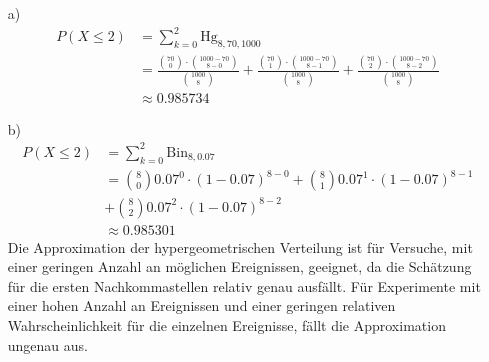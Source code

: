 \begin{enumerate}
	\item[a)] 
		\begin{equation*}
			\begin{split}
				P(X \leq 2) &= \sum_{k=0}^{2} \text{Hg}_{8,70,1000}\\
				& = \frac{{70 \choose 0} \cdot {1000 - 70 \choose 8 - 0}}{{1000\choose 8}} 
				+ \frac{{70 \choose 1} \cdot {1000 - 70 \choose 8 - 1}}{{1000\choose 8}}
				+ \frac{{70 \choose 2} \cdot {1000 - 70 \choose 8 - 2}}{{1000\choose 8}} \\
				& \approx 0.985734
			\end{split}
		\end{equation*}
	\item[b)]
		\begin{equation*}
			\begin{split}
				P(X \leq 2) & = \sum_{k = 0}^{2} \text{Bin}_{8, 0.07}\\
				& = {8 \choose 0} 0.07^{0}\cdot (1-0.07)^{8-0} 
				+ {8 \choose 1} 0.07^{1}\cdot (1-0.07)^{8-1} \\ 
				&+ {8 \choose 2} 0.07^{2}\cdot (1-0.07)^{8-2} \\
				& \approx 0.985301
			\end{split}
		\end{equation*}
		Die Approximation der hypergeometrischen Verteilung ist für Versuche, mit einer geringen Anzahl an möglichen Ereignissen, geeignet, da die Schätzung für die ersten Nachkommastellen relativ genau ausfällt. Für Experimente mit einer hohen Anzahl an Ereignissen und einer geringen relativen Wahrscheinlichkeit für die einzelnen Ereignisse, fällt die Approximation ungenau aus.
\end{enumerate}